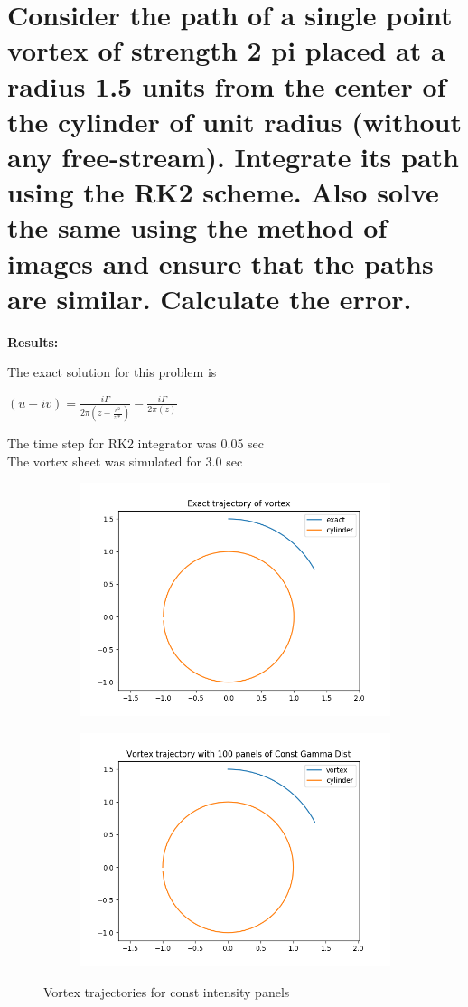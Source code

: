 \documentclass[a4paper,11pt]{article}
\begin{document}
	
	\newpage
	\section{Consider the path of a single point vortex of strength 2 pi placed at a radius 1.5 units from the center of the cylinder of unit radius (without any free-stream). Integrate its path using the RK2 scheme. Also solve the same using the method of images and ensure that the paths are similar. Calculate the error.}
	
	\textbf{Results:}
	
	The exact solution for this problem is
	
	\begin{center}
		$ (u - iv) = \frac{i\Gamma}{2\pi(z - \frac{r^2}{z*})} - \frac{i\Gamma}{2\pi(z)}$
	\end{center}
	The time step for RK2 integrator was 0.05 sec\\
	The vortex sheet was simulated for 3.0 sec\\

	
	\begin{figure}[h]
		\centering
		\begin{subfigure}[h]{.5\textwidth}
			\centering
			\includegraphics[width=.8\linewidth]{Exact_sol.png}
			\caption{}
			\label{fig:2aa}
		\end{subfigure}%
		\begin{subfigure}[h]{.5\textwidth}
			\centering
			\includegraphics[width=.8\linewidth]{q2const_vort_traj.png}
			\caption{}
			\label{fig:2ab}
		\end{subfigure}
		\caption{Vortex trajectories for const intensity panels}
		
	\end{figure}
	
\end{document}
